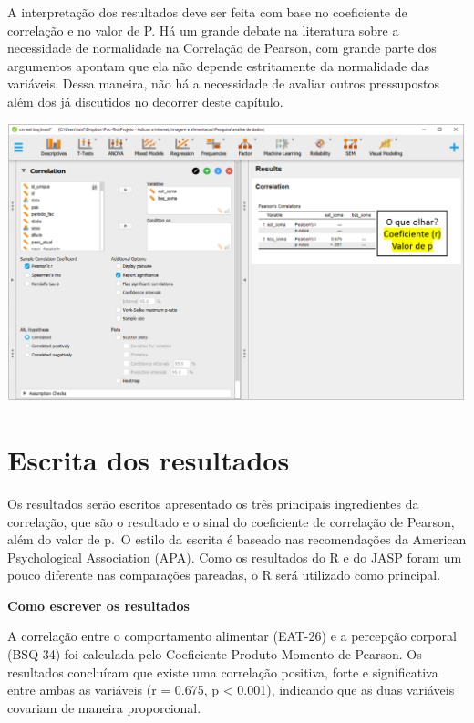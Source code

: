 \documentclass[
]{book}
\begin{document}
A interpretação dos resultados deve ser feita com base no coeficiente de
correlação e no valor de P. Há um grande debate na literatura sobre a
necessidade de normalidade na Correlação de Pearson, com grande parte
dos argumentos apontam que ela não depende estritamente da normalidade
das variáveis. Dessa maneira, não há a necessidade de avaliar outros
pressupostos além dos já discutidos no decorrer deste capítulo.

\includegraphics{./img/cap_correlacao_resultados.png}

\hypertarget{escrita-dos-resultados-11}{%
\section{Escrita dos resultados}\label{escrita-dos-resultados-11}}

Os resultados serão escritos apresentado os três principais ingredientes
da correlação, que são o resultado e o sinal do coeficiente de
correlação de Pearson, além do valor de p.~O estilo da escrita é baseado
nas recomendações da American Psychological Association (APA). Como os
resultados do R e do JASP foram um pouco diferente nas comparações
pareadas, o R será utilizado como principal.

\begin{writing}
\textbf{Como escrever os resultados}

A correlação entre o comportamento alimentar (EAT-26) e a percepção
corporal (BSQ-34) foi calculada pelo Coeficiente Produto-Momento de
Pearson. Os resultados concluíram que existe uma correlação positiva,
forte e significativa entre ambas as variáveis (r = 0.675, p \textless{}
0.001), indicando que as duas variáveis covariam de maneira
proporcional.
\end{writing}
\end{document}
